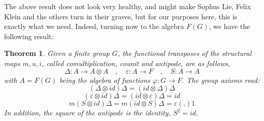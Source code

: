 \documentclass[12pt]{amsbook}
\newtheorem{theorem}{Theorem}[chapter]
\begin{document}
The above result does not look very healthy, and might make Sophus Lie, Felix Klein and the others turn in their graves, but for our purposes here, this is exactly what we need. Indeed, turning now to the algebra $F(G)$, we have the following result:


\begin{theorem}
Given a finite group $G$, the functional transposes of the structural maps $m,u,i$, called comultiplication, counit and antipode, are as follows, 
$$\Delta:A\to A\otimes A\quad,\quad 
\varepsilon:A\to F\quad,\quad 
S:A\to A$$
with $A=F(G)$ being the algebra of functions $\varphi:G\to F$. The group axioms read:
$$(\Delta\otimes id)\Delta=(id\otimes \Delta)\Delta$$
$$(\varepsilon\otimes id)\Delta=(id\otimes\varepsilon)\Delta=id$$
$$m(S\otimes id)\Delta=m(id\otimes S)\Delta=\varepsilon(.)1$$
In addition, the square of the antipode is the identity, $S^2=id$.
\end{theorem}
\end{document}

